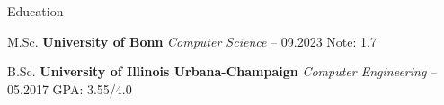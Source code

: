 \begin{rubric}{Education}


\entry*[] M.Sc. \textbf{University of Bonn} \hfill  \emph{Computer Science}    -- 09.2023 \hfill Note:  1.7 %

\entry*[] B.Sc. \textbf{University of Illinois Urbana-Champaign} \hfill  \emph{Computer Engineering}  -- 05.2017 \hfill GPA: 3.55/4.0 \newline %



\end{rubric}